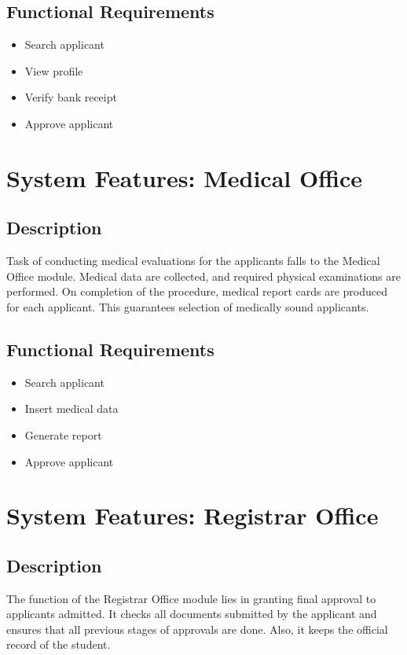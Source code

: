 \subsection{Functional Requirements}

\begin{itemize}
    \item Search applicant
    \item View profile
    \item Verify bank receipt
    \item Approve applicant
\end{itemize}

\section{System Features: Medical Office}

\subsection{Description}
Task of conducting medical evaluations for the applicants falls to the Medical Office module.
Medical data are collected, and required physical examinations are performed.
On completion of the procedure, medical report cards are produced for each applicant.
This guarantees selection of medically sound applicants.

\subsection{Functional Requirements}


\begin{itemize}
    \item Search applicant
    \item Insert medical data
    \item Generate report
    \item Approve applicant
\end{itemize}

\section{System Features: Registrar Office}

\subsection{Description}
The function of the Registrar Office module lies in granting final approval to applicants admitted. 
It checks all documents submitted by the applicant and ensures that all previous stages of approvals are done. 
Also, it keeps the official record of the student.

